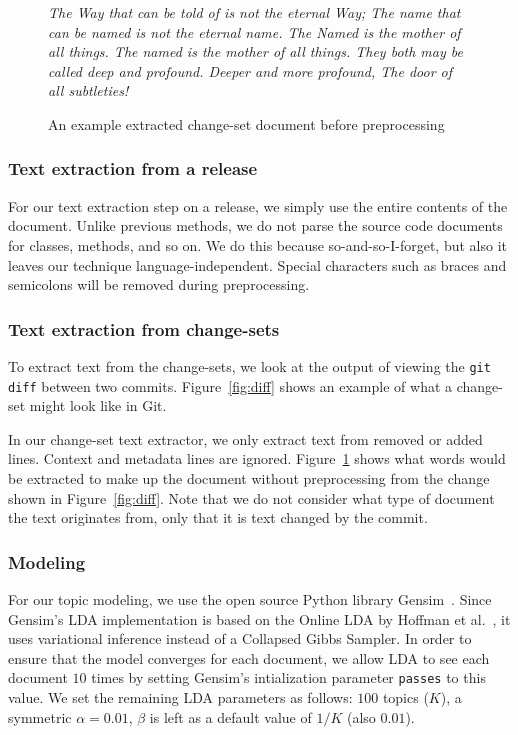 \begin{figure}[ht]
\em
\footnotesize
The Way that can be told of is not the eternal Way;
The name that can be named is not the eternal name.
The Named is the mother of all things.
The named is the mother of all things.
They both may be called deep and profound.
Deeper and more profound,
The door of all subtleties!
\caption{An example extracted change-set document before preprocessing}
\label{fig:diffdocument}
\end{figure}

\subsubsection{Text extraction from a release}

For our text extraction step on a release,
we simply use the entire contents of the document.
Unlike previous methods\needcite,
we do not parse the source code documents for classes, methods, and so on.
We do this because so-and-so-I-forget\needcite,
but also it leaves our technique language-independent.
Special characters such as braces and semicolons will be removed during
preprocessing.

\subsubsection{Text extraction from change-sets}


To extract text from the change-sets, we look at the output of viewing
the \texttt{git diff} between two commits.
Figure~\ref{fig:diff} shows an example of what a change-set might look
like in Git.

In our change-set text extractor, we only extract text from removed or added lines.
Context and metadata lines are ignored.
Figure~\ref{fig:diffdocument} shows what words would be extracted to make up the document without preprocessing
from the change shown in Figure~\ref{fig:diff}.
Note that we do not consider what type of document the text originates from,
only that it is text changed by the commit.

\subsubsection{Modeling}

For our topic modeling, we use the open source Python library Gensim~\cite{Gensim}.
Since Gensim's LDA implementation is based on the
Online LDA by Hoffman et al.~\cite{Hoffman-etal:2010},
it uses variational inference instead of a Collapsed Gibbs Sampler.
In order to ensure that the model converges for each document,
we allow LDA to see each document $10$ times by setting
Gensim's intialization parameter \texttt{passes} to this value.
We set the remaining LDA parameters as follows:
$100$ topics ($K$),
a symmetric $\alpha=0.01$,
$\beta$ is left as a default value of $1/K$ (also $0.01$).


